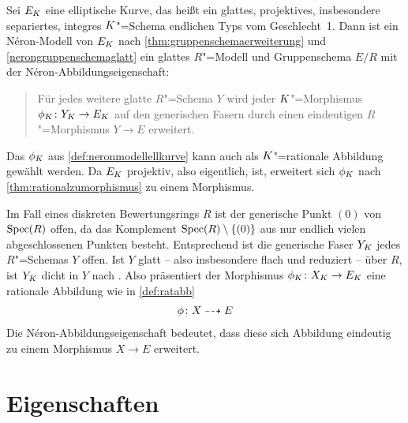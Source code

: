 
\begin{SatzDefinition}
  \label{def:neronmodellellkurve}
  Sei $E_{K}$ eine elliptische Kurve, das heißt ein
  glattes, projektives, insbesondere separiertes, integres
  $K$"=Schema endlichen Typs vom Geschlecht~1.
  Dann ist ein Néron-Modell von $E_{K}$ nach
  \ref{thm:gruppenschemaerweiterung} und \ref{nerongruppenschemaglatt}
  ein glattes $R$"=Modell und Gruppenschema $E/R$ mit der
  Néron-Abbildungseigenschaft:
  \begin{quote}
    Für jedes weitere glatte $R$"=Schema $Y$ wird jeder
    $K$"=Morphismus ${\phi_{K}\colon Y_{K}\to E_{K}}$ auf den generischen
    Fasern durch einen eindeutigen $R$"=Morphismus ${Y\to E}$ erweitert.
  \end{quote}
\end{SatzDefinition}
\begin{Bemerkung}\label{thm:dichtefaser}
  Das $\phi_{K}$ aus \ref{def:neronmodellellkurve} kann auch als
  $K$"=rationale Abbildung gewählt werden. Da $E_{K}$ projektiv, also
  eigentlich, ist, erweitert sich $\phi_{K}$ nach
  \ref{thm:rationalzumorphismus} zu einem Morphismus.

  Im Fall eines diskreten Bewertungsrings $R$ ist der generische Punkt
  $(0)$ von $\operatorname{Spec}(R)$ offen, da das Komplement
  $\operatorname{Spec}(R)\setminus\{(0)\}$ aus nur endlich vielen abgeschlossenen
  Punkten besteht. Entsprechend ist die generische Faser $Y_{K}$ jedes
  $R$"=Schemas $Y$ offen.
  Ist $Y$ glatt – also insbesondere flach und reduziert – über $R$,
  ist $Y_{K}$ dicht in $Y$ nach \cite[Proposition~III.9.7]{hartshorne}.
  Also präsentiert der Morphismus ${\phi_{K}\colon X_{K}\to E_{K}}$ eine
  rationale Abbildung wie in \ref{def:ratabb}
  \begin{gather*}
    \phi\colon X\dashrightarrow E
  \end{gather*}
  Die Néron-Abbildungseigenschaft bedeutet, dass diese sich Abbildung eindeutig zu einem
  Morphismus $X\to E$ erweitert.
\end{Bemerkung}


\section{Eigenschaften}
